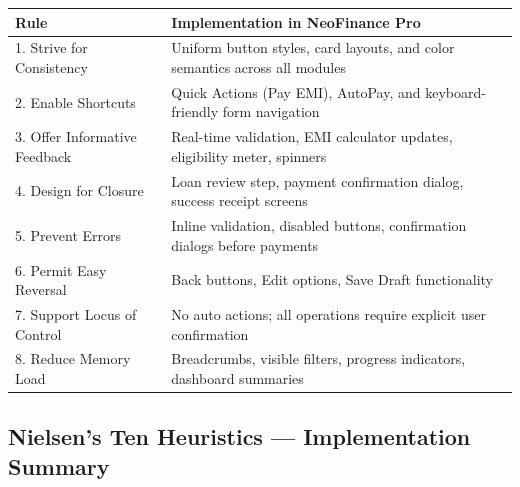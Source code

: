 \documentclass[11pt,a4paper]{article}
\begin{document}
\begin{table}[H]
\centering\small
\begin{tabularx}{\textwidth}{l X}
\toprule
\textbf{Rule} & \textbf{Implementation in NeoFinance Pro} \\
\midrule

1. Strive for Consistency &
Uniform button styles, card layouts, and color semantics across all modules \\

2. Enable Shortcuts &
Quick Actions (Pay EMI), AutoPay, and keyboard-friendly form navigation \\

3. Offer Informative Feedback &
Real-time validation, EMI calculator updates, eligibility meter, spinners \\

4. Design for Closure &
Loan review step, payment confirmation dialog, success receipt screens \\

5. Prevent Errors &
Inline validation, disabled buttons, confirmation dialogs before payments \\

6. Permit Easy Reversal &
Back buttons, Edit options, Save Draft functionality \\

7. Support Locus of Control &
No auto actions; all operations require explicit user confirmation \\

8. Reduce Memory Load &
Breadcrumbs, visible filters, progress indicators, dashboard summaries \\

\bottomrule
\end{tabularx}
\end{table}
\subsection{Nielsen's Ten Heuristics — Implementation Summary}
\end{document}
